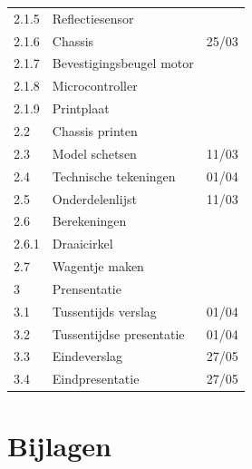 \documentclass[kulak]{kulakarticle} %
\begin{document}
\begin{tabular}{lll}
	2.1.5 & Reflectiesensor & \\
	2.1.6 & Chassis & 25/03\\
	2.1.7 & Bevestigingsbeugel motor & \\
	2.1.8 & Microcontroller & \\
	2.1.9 & Printplaat & \\
	2.2 & Chassis printen & \\
	2.3 & Model schetsen & 11/03\\
	2.4 & Technische tekeningen & 01/04\\
	2.5 & Onderdelenlijst & 11/03\\
	2.6 & Berekeningen & \\
	2.6.1 & Draaicirkel & \\
	2.7 & Wagentje maken & \\
	\hline
	3 & Prensentatie & \\
	3.1 & Tussentijds verslag & 01/04 \\
	3.2 & Tussentijdse presentatie & 01/04\\
	3.3 & Eindeverslag & 27/05 \\
	3.4 & Eindpresentatie & 27/05\\ \hline
\end{tabular}

\section{Bijlagen}
\end{document}
